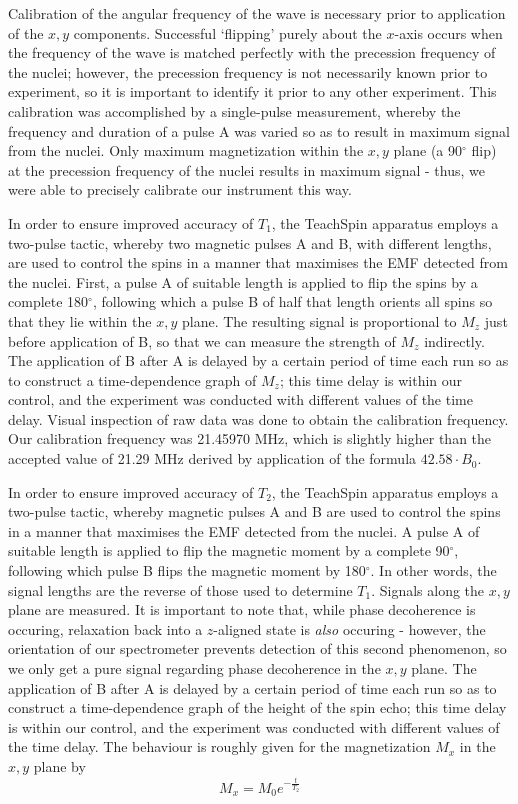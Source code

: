 \documentclass[aps,prl,nofootinbib,twocolumn,superscriptaddress,groupedaddress]{revtex4}  %
\begin{document}
Calibration of the angular frequency of the wave is necessary prior to application of the $x,y$ components. Successful `flipping' purely about the $x$-axis occurs when the frequency of the wave is matched perfectly with the precession frequency of the nuclei; however, the precession frequency is not necessarily known prior to experiment, so it is important to identify it prior to any other experiment. This calibration was accomplished by a single-pulse measurement, whereby the frequency and duration of a pulse A was varied so as to result in maximum signal from the nuclei. Only maximum magnetization within the $x,y$ plane (a 90$^{\circ}$ flip) at the precession frequency of the nuclei results in maximum signal - thus, we were able to precisely calibrate our instrument this way.

In order to ensure improved accuracy of $T_{1}$, the TeachSpin apparatus employs a two-pulse tactic, whereby two magnetic pulses A and B, with different lengths, are used to control the spins in a manner that maximises the EMF detected from the nuclei. First, a pulse A of suitable length is applied to flip the spins by a complete 180$^{\circ}$, following which a pulse B of half that length orients all spins so that they lie within the $x,y$ plane. The resulting signal is proportional to $M_{z}$ just before application of B, so that we can measure the strength of $M_{z}$ indirectly. The application of B after A is delayed by a certain period of time each run so as to construct a time-dependence graph of $M_{z}$; this time delay is within our control, and the experiment was conducted with different values of the time delay. Visual inspection of raw data was done to obtain the calibration frequency. Our calibration frequency was 21.45970 MHz, which is slightly higher than the accepted value of 21.29 MHz derived by application of the formula $42.58\cdot B_{0}$.

In order to ensure improved accuracy of $T_{2}$, the TeachSpin apparatus employs a two-pulse tactic, whereby magnetic pulses A and B are used to control the spins in a manner that maximises the EMF detected from the nuclei. A pulse A of suitable length is applied to flip the magnetic moment by a complete 90$^{\circ}$, following which pulse B flips the magnetic moment by 180$^{\circ}$. In other words, the signal lengths are the reverse of those used to determine $T_{1}$. Signals along the $x,y$ plane are measured. It is important to note that, while phase decoherence is occuring, relaxation back into a $z$-aligned state is \textit{also} occuring - however, the orientation of our spectrometer prevents detection of this second phenomenon, so we only get a pure signal regarding phase decoherence in the $x,y$ plane. The application of B after A is delayed by a certain period of time each run so as to construct a time-dependence graph of the height of the spin echo; this time delay is within our control, and the experiment was conducted with different values of the time delay. The behaviour is roughly given for the magnetization $M_{x}$ in the $x,y$ plane by\cite{inst}
\begin{equation}
M_{x} = M_{0}e^{-\frac{t}{T_{2}}}
\end{equation}
\end{document}
